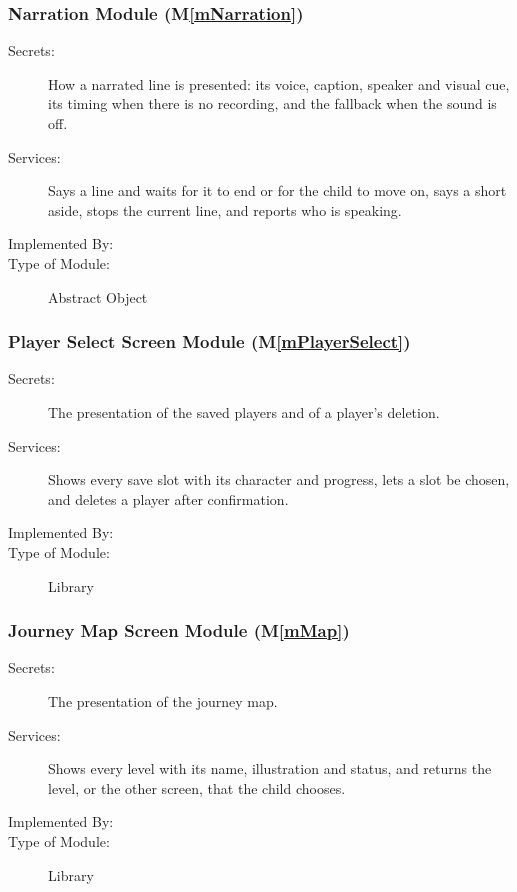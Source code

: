 \documentclass[10pt, titlepage]{article}
\newcommand{\mplainref}[1]{M\ref*{#1}}
\begin{document}
\subsubsection{Narration Module (\mplainref{mNarration})}\label{md:mNarration}

\begin{description}
\item[Secrets:] How a narrated line is presented: its voice, caption, speaker
  and visual cue, its timing when there is no recording, and the fallback when
  the sound is off.
\item[Services:] Says a line and waits for it to end or for the child to move
  on, says a short aside, stops the current line, and reports who is speaking.
\item[Implemented By:] \progname{}
\item[Type of Module:] Abstract Object
\end{description}

\subsubsection{Player Select Screen Module (\mplainref{mPlayerSelect})}\label{md:mPlayerSelect}

\begin{description}
\item[Secrets:] The presentation of the saved players and of a player's
  deletion.
\item[Services:] Shows every save slot with its character and progress, lets a
  slot be chosen, and deletes a player after confirmation.
\item[Implemented By:] \progname{}
\item[Type of Module:] Library
\end{description}

\subsubsection{Journey Map Screen Module (\mplainref{mMap})}\label{md:mMap}

\begin{description}
\item[Secrets:] The presentation of the journey map.
\item[Services:] Shows every level with its name, illustration and status, and
  returns the level, or the other screen, that the child chooses.
\item[Implemented By:] \progname{}
\item[Type of Module:] Library
\end{description}
\end{document}
